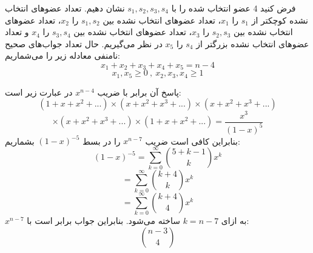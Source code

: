 \p
فرض کنید
4
عضو انتخاب شده را با 
$s_1 , s_2 , s_3 , s_4$
نشان دهیم.
تعداد عضو‌های انتخاب نشده کوچکتر از
$s_1$
را 
 $x_1$،
 تعداد عضوهای انتخاب نشده بین  
$s_1 , s_2$
را
 $x_2$،
 تعداد عضو‌های انتخاب نشده بین 
$s_2 , s_3$
را
$x_3$،
تعداد عضو‌های انتخاب نشده بین 
$s_3 , s_4$
را
$x_4$ و
تعداد عضوهای انتخاب نشده بزرگتر از 
$s_4$
را 
$x_5$
در نظر می‌گیریم. حال تعداد جواب‌های صحیح نامنفی معادله زیر را 
می‌شماریم:
$$x_1 + x_2 + x_3 + x_4 + x_5 = n - 4$$
$$x_1 , x_5 \geq 0  \: , \:  x_2 , x_3 , x_4 \geq 1$$

پاسخ آن برابر با ضریب
$x^{n - 4}$
 در عبارت زیر است:
$$(1 + x + x^2 + ...)\times(x + x^2 + x^3 + ...)\times(x + x^2 + x^3 + ...)$$
$$\times(x + x^2 + x^3 + ...)\times(1 + x + x^2 + ...) = \frac{x^3}{(1 - x)^5}$$
 بنابراین کافی است ضریب 
 $x^{n - 7}$
 را در بسط 
 $(1 - x)^{-5}$
 بشماریم:
$$(1 - x)^{-5} = \sum_{k = 0}^{\infty} \binom{5 + k - 1}{k}x^k$$
$$= \sum_{k = 0}^{\infty} \binom{k + 4}{k}x^k$$
$$= \sum_{k = 0}^{\infty} \binom{k + 4}{4}x^k$$
$x^{n - 7}$ به ازای $k = n -7$ ساخته می‌شود. بنابراین جواب برابر است با:
$$\binom{n - 3}{4}$$
